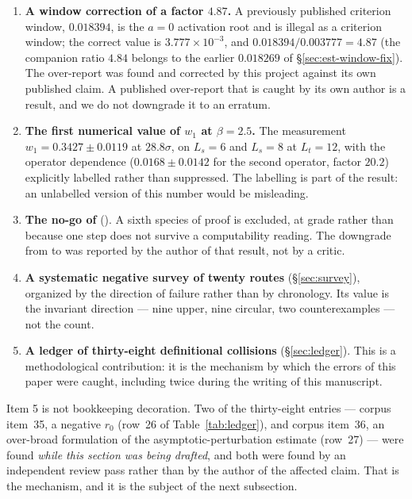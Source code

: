 \begin{enumerate}
\item[\textbf{1.}] \textbf{A window correction of a factor $4.87$.} A previously published
criterion window, $0.018394$, is the $a = 0$ activation root and is illegal as a criterion window;
the correct value is $3.777\times 10^{-3}$, and $0.018394/0.003777 = 4.87$ (the companion ratio
$4.84$ belongs to the earlier $0.018269$ of \S\ref{sec:est-window-fix}). The over-report was found
and corrected by this project
against its own published claim. A published over-report that is caught by its own author is a
result, and we do not downgrade it to an erratum.
\item[\textbf{2.}] \textbf{The first numerical value of $w_1$ at $\beta = 2.5$.} The measurement
$w_1 = 0.3427 \pm 0.0119$ at $28.8\sigma$, on $L_s = 6$ and $L_s = 8$ at $L_t = 12$, with the
operator dependence ($0.0168 \pm 0.0142$ for the second operator, factor $20.2$) explicitly
labelled rather than suppressed. The labelling is part of the result: an unlabelled version of this
number would be misleading.
\item[\textbf{3.}] \textbf{The no-go of } (\LC{}). A sixth species of proof is
excluded, at grade \LC{} rather than \LT{} because one step does not survive a computability
reading. The downgrade from \LT{} to \LC{} was reported by the author of that result, not by a
critic.
\item[\textbf{4.}] \textbf{A systematic negative survey of twenty routes} (\S\ref{sec:survey}),
organized by the direction of failure rather than by chronology. Its value is the invariant
direction --- nine upper, nine circular, two counterexamples --- not the count.
\item[\textbf{5.}] \textbf{A ledger of thirty-eight definitional collisions} (\S\ref{sec:ledger}).
This is a methodological contribution: it is the mechanism by which the errors of this paper were
caught, including twice during the writing of this manuscript.
\end{enumerate}

\noindent Item 5 is not bookkeeping decoration. Two of the thirty-eight entries --- corpus item~35,
a negative $r_0$ (row~26 of Table~\ref{tab:ledger}), and corpus item~36, an over-broad formulation
of the asymptotic-perturbation estimate (row~27) --- were found
\emph{while this section was being drafted}, and both were found by an independent review pass
rather than by the author of the affected claim. That is the mechanism, and it is the subject of
the next subsection.

